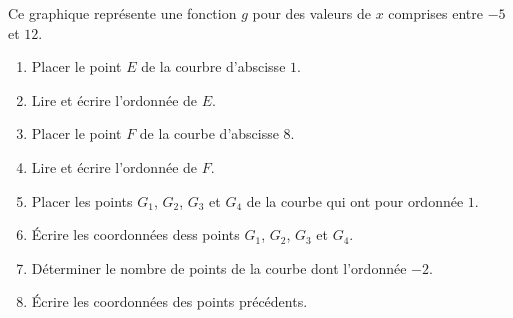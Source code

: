 \begin{exercice}
    Ce graphique représente une fonction $g$ pour des valeurs de $x$ comprises entre $-5$ et $12$.
    
    \begin{enumerate}
        \item Placer le point $E$ de la courbre d'abscisse $1$.
        \item Lire et écrire l'ordonnée de $E$.
        \item Placer le point $F$ de la courbe d'abscisse $8$.
        \item Lire et écrire l'ordonnée de $F$.
        \item Placer les points $G_1$, $G_2$, $G_3$ et $G_4$ de la courbe qui ont pour ordonnée $1$.
        \item Écrire les coordonnées dess points $G_1$, $G_2$, $G_3$ et $G_4$.
        \item Déterminer le nombre de points de la courbe dont l'ordonnée $-2$.
        \item Écrire les coordonnées des points précédents.
    \end{enumerate}
\end{exercice}
